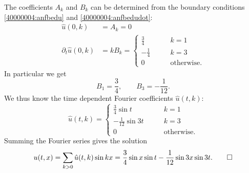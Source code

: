 \begin{loesung}
The coefficients $A_k$ and $B_k$ can be determined from the boundary
conditions \eqref{40000004:anfbedu} and \eqref{40000004:anfbedudot}:
\begin{align*}
\hat u(0,k)&=A_k=0\\
\partial_t \hat u(0,k)&=kB_k=
\begin{cases}
\frac34&\qquad k= 1\\
-\frac14&\qquad k= 3\\
0&\qquad \text{otherwise.}
\end{cases}
\end{align*}
In particular we get
\[
B_1=\frac34,\qquad B_3=-\frac1{12}.
\]
We thus know the time dependent Fourier coefficients $\hat u(t,k)$:
\[
\hat u(t,k)=
\begin{cases}
\frac34\sin t &\qquad k= 1\\
-\frac1{12}\sin 3t&\qquad k= 3\\
0&\qquad \text{otherwise.}
\end{cases}
\]
Summing the Fourier series gives the solution
\[
u(t,x)=\sum_{k>0}\hat u(t,k) \sin kx
= \frac34\sin x \sin t -\frac1{12}\sin 3x \sin 3t.
\qedhere
\]
\end{loesung}
 
